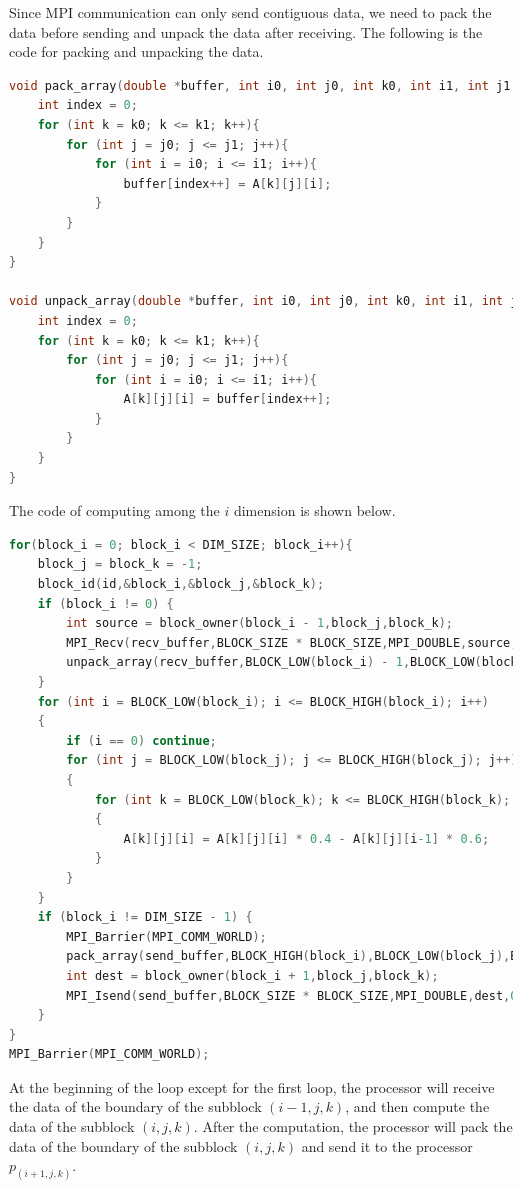 Since MPI communication can only send contiguous data, we need to pack the data before sending and unpack the data after receiving. The following is the code for packing and unpacking the data.

\begin{lstlisting}[language=C]
void pack_array(double *buffer, int i0, int j0, int k0, int i1, int j1, int k1){
    int index = 0;
    for (int k = k0; k <= k1; k++){
        for (int j = j0; j <= j1; j++){
            for (int i = i0; i <= i1; i++){
                buffer[index++] = A[k][j][i];
            }
        }
    }
}

void unpack_array(double *buffer, int i0, int j0, int k0, int i1, int j1, int k1){
    int index = 0;
    for (int k = k0; k <= k1; k++){
        for (int j = j0; j <= j1; j++){
            for (int i = i0; i <= i1; i++){
                A[k][j][i] = buffer[index++];
            }
        }
    }
}
\end{lstlisting}

The code of computing among the $i$ dimension is shown below.

\begin{lstlisting}[language=C]
for(block_i = 0; block_i < DIM_SIZE; block_i++){
    block_j = block_k = -1;
    block_id(id,&block_i,&block_j,&block_k);
    if (block_i != 0) {
        int source = block_owner(block_i - 1,block_j,block_k);
        MPI_Recv(recv_buffer,BLOCK_SIZE * BLOCK_SIZE,MPI_DOUBLE,source,0,MPI_COMM_WORLD,MPI_STATUS_IGNORE);
        unpack_array(recv_buffer,BLOCK_LOW(block_i) - 1,BLOCK_LOW(block_j),BLOCK_LOW(block_k),BLOCK_LOW(block_i) - 1,BLOCK_HIGH(block_j),BLOCK_HIGH(block_k));
    }
    for (int i = BLOCK_LOW(block_i); i <= BLOCK_HIGH(block_i); i++)
    {
        if (i == 0) continue;
        for (int j = BLOCK_LOW(block_j); j <= BLOCK_HIGH(block_j); j++)
        {
            for (int k = BLOCK_LOW(block_k); k <= BLOCK_HIGH(block_k); k++)
            {
                A[k][j][i] = A[k][j][i] * 0.4 - A[k][j][i-1] * 0.6;
            }
        }
    }
    if (block_i != DIM_SIZE - 1) {
        MPI_Barrier(MPI_COMM_WORLD);
        pack_array(send_buffer,BLOCK_HIGH(block_i),BLOCK_LOW(block_j),BLOCK_LOW(block_k),BLOCK_HIGH(block_i),BLOCK_HIGH(block_j),BLOCK_HIGH(block_k));
        int dest = block_owner(block_i + 1,block_j,block_k);
        MPI_Isend(send_buffer,BLOCK_SIZE * BLOCK_SIZE,MPI_DOUBLE,dest,0,MPI_COMM_WORLD,&request);
    }
}
MPI_Barrier(MPI_COMM_WORLD);
\end{lstlisting}

At the beginning of the loop except for the first loop, the processor will receive the data of the boundary of the subblock $(i-1,j,k)$, and then compute the data of the subblock $(i,j,k)$. After the computation, the processor will pack the data of the boundary of the subblock $(i,j,k)$ and send it to the processor $p_{(i+1,j,k)}$.


